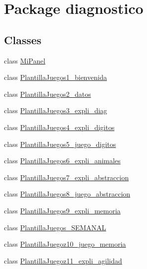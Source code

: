 \hypertarget{namespacediagnostico}{}\section{Package diagnostico}
\label{namespacediagnostico}
\subsection*{Classes}
\begin{DoxyCompactItemize}
\item 
class \mbox{\hyperlink{classdiagnostico_1_1_mi_panel}{Mi\+Panel}}
\item 
class \mbox{\hyperlink{classdiagnostico_1_1_plantilla_juegos1__bienvenida}{Plantilla\+Juegos1\+\_\+bienvenida}}
\item 
class \mbox{\hyperlink{classdiagnostico_1_1_plantilla_juegos2__datos}{Plantilla\+Juegos2\+\_\+datos}}
\item 
class \mbox{\hyperlink{classdiagnostico_1_1_plantilla_juegos3__expli__diag}{Plantilla\+Juegos3\+\_\+expli\+\_\+diag}}
\item 
class \mbox{\hyperlink{classdiagnostico_1_1_plantilla_juegos4__expli__digitos}{Plantilla\+Juegos4\+\_\+expli\+\_\+digitos}}
\item 
class \mbox{\hyperlink{classdiagnostico_1_1_plantilla_juegos5__juego__digitos}{Plantilla\+Juegos5\+\_\+juego\+\_\+digitos}}
\item 
class \mbox{\hyperlink{classdiagnostico_1_1_plantilla_juegos6__expli__animales}{Plantilla\+Juegos6\+\_\+expli\+\_\+animales}}
\item 
class \mbox{\hyperlink{classdiagnostico_1_1_plantilla_juegos7__expli__abstraccion}{Plantilla\+Juegos7\+\_\+expli\+\_\+abstraccion}}
\item 
class \mbox{\hyperlink{classdiagnostico_1_1_plantilla_juegos8__juego__abstraccion}{Plantilla\+Juegos8\+\_\+juego\+\_\+abstraccion}}
\item 
class \mbox{\hyperlink{classdiagnostico_1_1_plantilla_juegos9__expli__memoria}{Plantilla\+Juegos9\+\_\+expli\+\_\+memoria}}
\item 
class \mbox{\hyperlink{classdiagnostico_1_1_plantilla_juegos___s_e_m_a_n_a_l}{Plantilla\+Juegos\+\_\+\+S\+E\+M\+A\+N\+AL}}
\item 
class \mbox{\hyperlink{classdiagnostico_1_1_plantilla_juegoz10__juego__memoria}{Plantilla\+Juegoz10\+\_\+juego\+\_\+memoria}}
\item 
class \mbox{\hyperlink{classdiagnostico_1_1_plantilla_juegoz11__expli__agilidad}{Plantilla\+Juegoz11\+\_\+expli\+\_\+agilidad}}

\end{DoxyCompactItemize}
